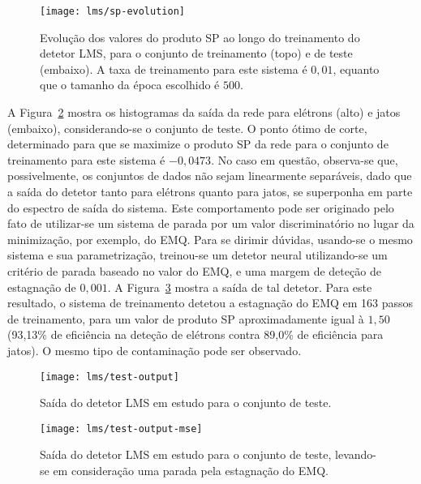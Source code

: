 \begin{figure}
\begin{center}
\texttt{[image: lms/sp-evolution]}
\end{center}
\caption{Evolução dos valores do produto SP ao longo do treinamento do detetor
LMS, para o conjunto de treinamento (topo) e de teste (embaixo). A taxa de
treinamento para este sistema é $0,01$, equanto que o tamanho da época
escolhido é $500$.}
\label{fig:lms-sp-evo}
\end{figure}

A Figura~\ref{fig:lms-test-output} mostra os histogramas da saída da rede para
elétrons (alto) e jatos (embaixo), considerando-se o conjunto de teste. O
ponto ótimo de corte, determinado para que se maximize o produto SP da rede
para o conjunto de treinamento para este sistema é $-0,0473$. No caso em
questão, observa-se que, possivelmente, os conjuntos de dados não sejam
linearmente separáveis, dado que a saída do detetor tanto para elétrons quanto
para jatos, se superponha em parte do espectro de saída do sistema. Este
comportamento pode ser originado pelo fato de utilizar-se um sistema de parada
por um valor discriminatório no lugar da minimização, por exemplo, do
EMQ. Para se dirimir dúvidas, usando-se o mesmo sistema e sua parametrização,
treinou-se um detetor neural utilizando-se um critério de parada baseado no
valor do EMQ, e uma margem de deteção de estagnação de $0,001$. A
Figura~\ref{fig:lms-test-output-mse} mostra a saída de tal detetor. Para este
resultado, o sistema de treinamento detetou a estagnação do EMQ em 163 passos
de treinamento, para um valor de produto SP aproximadamente igual à $1,50$
(93,13\% de eficiência na deteção de elétrons contra 89,0\% de eficiência para
jatos). O mesmo tipo de contaminação pode ser observado.

\begin{figure}
\begin{center}
\texttt{[image: lms/test-output]}
\end{center}
\caption{Saída do detetor LMS em estudo para o conjunto de teste.}
\label{fig:lms-test-output}
\end{figure}

\begin{figure}
\begin{center}
\texttt{[image: lms/test-output-mse]}
\end{center}
\caption{Saída do detetor LMS em estudo para o conjunto de teste, levando-se
em consideração uma parada pela estagnação do EMQ.}
\label{fig:lms-test-output-mse}
\end{figure}

